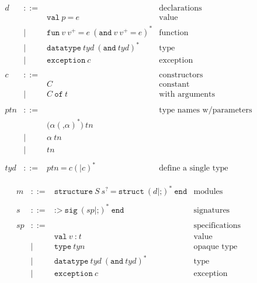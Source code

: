 \documentclass[12pt,a4paper]{book}
\newcommand{\gramsep}{|}
\begin{document}
\[
\begin{array}{lcll}
d &::=& &\mbox{declarations}\\
&&\texttt{val}\ p\ \texttt{=}\ e&\mbox{value}\\
&|& \texttt{fun}\ v\ v^+\ \texttt{=}\ e\ (\texttt{and}\ v\ v^+\ \texttt{=}\ e)^*&\mbox{function}\\
&|&  \texttt{datatype}\ \mathit{tyd}\ (\texttt{and}\ \mathit{tyd})^*&\mbox{type}\\
&|& \texttt{exception}\ c&\mbox{exception}\\\\

c & ::= &&\mbox{constructors}\\
&& C&\mbox{constant}\\
& \gramsep &C\ \texttt{of}\ t&\mbox{with arguments}\\\\

\mathit{ptn} &::=& &\mbox{type names w/parameters}\\
&& \texttt{(}\alpha(\texttt{,}\alpha)^*\texttt{)}\ \mathit{tn}\\
&\gramsep& \alpha\ \mathit{tn}\\
&\gramsep& \mathit{tn}\\\\

\mathit{tyd} & ::= & \mathit{ptn}\ \texttt{=}\ c(\texttt{|}c)^* & \mbox{define a single type}
\end{array}
\]

\[
\begin{array}{lcll}
m &::=& \texttt{structure}\ S\ s^?\ \texttt{=}\ \texttt{struct}\ (d|\texttt{;})^*\ \texttt{end}&\mbox{modules}\\\\

s &::=& \texttt{:>}\ \texttt{sig}\ (\mathit{sp}|\texttt{;})^*\ \texttt{end}&\mbox{signatures}\\\\

\mathit{sp}&::=&  &\mbox{specifications}\\
&&\texttt{val}\ v\ \texttt{:}\ t& \mbox{value}\\
&\gramsep& \texttt{type}\ \textit{tyn}&\mbox{opaque type}\\
&|&  \texttt{datatype}\ \mathit{tyd}\ (\texttt{and}\ \mathit{tyd})^*&\mbox{type}\\
&|& \texttt{exception}\ c&\mbox{exception}
\end{array}
\]
\end{document}
